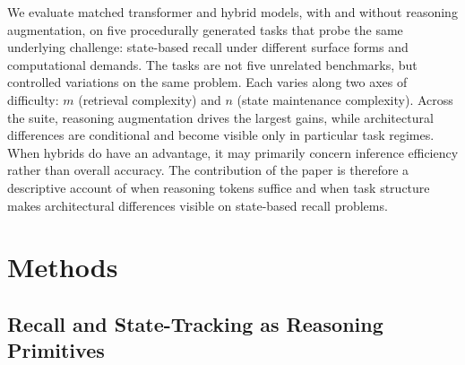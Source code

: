 \documentclass[11pt]{article}
\theoremstyle{definition}
\begin{document}
We evaluate matched transformer and hybrid models, with and without reasoning augmentation, on five procedurally generated tasks that probe the same underlying challenge: state-based recall under different surface forms and computational demands. The tasks are not five unrelated benchmarks, but controlled variations on the same problem. Each varies along two axes of difficulty: $m$ (retrieval complexity) and $n$ (state maintenance complexity). Across the suite, reasoning augmentation drives the largest gains, while architectural differences are conditional and become visible only in particular task regimes. When hybrids do have an advantage, it may primarily concern inference efficiency rather than overall accuracy. The contribution of the paper is therefore a descriptive account of when reasoning tokens suffice and when task structure makes architectural differences visible on state-based recall problems.

\section{Methods}
\label{sec:methods}

\subsection{Recall and State-Tracking as Reasoning Primitives}


\end{document}
